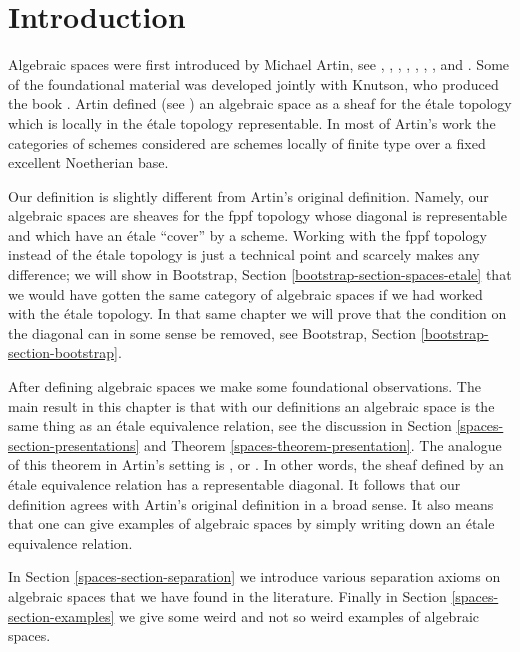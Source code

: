 \section{Introduction}
\label{spaces-section-introduction}
Algebraic spaces were first introduced by Michael Artin,
see \cite{ArtinI}, \cite{ArtinII},
\cite{Artin-Theorem-Representability},
\cite{Artin-Construction-Techniques},
\cite{Artin-Algebraic-Spaces},
\cite{Artin-Algebraic-Approximation},
\cite{Artin-Implicit-Function},
and \cite{ArtinVersal}.
Some of the foundational material was developed jointly with
Knutson, who produced the book \cite{Kn}.
Artin defined (see \cite[Definition 1.3]{Artin-Implicit-Function})
an algebraic space as a sheaf for the \'etale topology
which is locally in the \'etale topology representable.
In most of Artin's work the categories of schemes
considered are schemes locally of finite type over a fixed
excellent Noetherian base.

\medskip\noindent
Our definition is slightly different from Artin's original definition.
Namely, our algebraic spaces are sheaves for the fppf topology
whose diagonal is representable and which have an \'etale ``cover''
by a scheme. Working with the fppf topology instead of the \'etale
topology is just a technical point and scarcely makes
any difference; we will show in
Bootstrap, Section \ref{bootstrap-section-spaces-etale}
that we would have gotten the same category of algebraic spaces
if we had worked with the \'etale topology. In that same chapter
we will prove that the condition on the diagonal
can in some sense be removed, see
Bootstrap, Section \ref{bootstrap-section-bootstrap}.

\medskip\noindent
After defining algebraic spaces we make some foundational observations.
The main result in this chapter is that with our definitions
an algebraic space is the same thing as an \'etale equivalence relation,
see the discussion in Section \ref{spaces-section-presentations} and
Theorem \ref{spaces-theorem-presentation}. The analogue of this theorem in
Artin's setting is \cite[Theorem 1.5]{Artin-Implicit-Function}, or
\cite[Proposition II.1.7]{Kn}. In other words, the sheaf
defined by an \'etale equivalence relation has a representable diagonal.
It follows that our definition agrees with Artin's original definition
in a broad sense. It also means that one can give examples of algebraic
spaces by simply writing down an \'etale equivalence relation.

\medskip\noindent
In Section \ref{spaces-section-separation} we introduce various separation
axioms on algebraic spaces that we have found in the literature.
Finally in Section \ref{spaces-section-examples}
we give some weird and not so weird examples of algebraic spaces.


